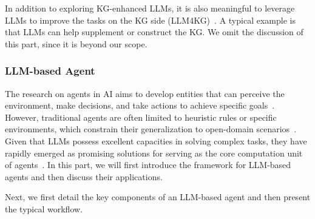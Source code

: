 {In addition to exploring KG-enhanced LLMs, it is also meaningful to leverage LLMs to improve the tasks on the KG side (\ie LLM4KG)~\cite{Pan-arxiv-2023-Unifying,Zhu-arxiv-23-LLMs}. 
A typical example is that LLMs can help supplement or construct the KG. 
We omit the discussion of this part, since it is beyond our scope. 

\subsubsection{LLM-based Agent}
\label{sec:llm_based_agent}
{The research on agents in AI aims to develop entities that can perceive the environment, make decisions, and take actions to achieve specific goals~\cite{Russell-Pearson-2020-Artificial}.
However, traditional agents are often limited to heuristic rules or specific environments, which constrain their generalization to open-domain scenarios~\cite{Lake-arxiv-2016-Building}.
Given that LLMs possess excellent capacities in solving complex tasks, they have rapidly emerged as promising solutions for serving as the core computation unit of agents~\cite{wang-arxiv-2023-a}.
In this part, we will first introduce the framework for LLM-based agents and then discuss their applications.}

{Next, we first detail the key components of an LLM-based agent and then present the typical workflow.}

}
